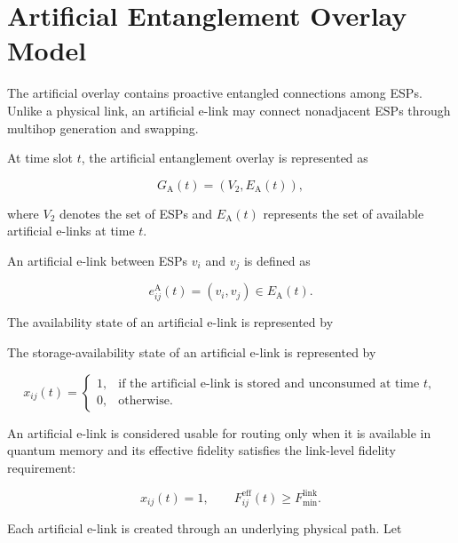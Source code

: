 \section{Artificial Entanglement Overlay Model}

The artificial overlay contains proactive entangled connections among ESPs.
Unlike a physical link, an artificial e-link may connect nonadjacent ESPs
through multihop generation and swapping.

At time slot $t$, the artificial entanglement overlay is represented as

\begin{equation}
    G_{\mathrm{A}}(t)
    =
    \left(
    V_{2},
    E_{\mathrm{A}}(t)
    \right),
\end{equation}

where $V_{2}$ denotes the set of ESPs and $E_{\mathrm{A}}(t)$ represents the set of available artificial e-links at time $t$.

An artificial e-link between ESPs $v_i$ and $v_j$ is defined as

\begin{equation}
    e_{ij}^{\mathrm{A}}(t)
    =
    \left(
    v_i,
    v_j
    \right)
    \in
    E_{\mathrm{A}}(t).
\end{equation}

The availability state of an artificial e-link is represented by

The storage-availability state of an artificial e-link is represented by

\begin{equation}
    x_{ij}(t)
    =
    \begin{cases}
        1, & \text{if the artificial e-link is stored and unconsumed at time } t,\\
        0, & \text{otherwise}.
    \end{cases}
\end{equation}

An artificial e-link is considered usable for routing only when it is
available in quantum memory and its effective fidelity satisfies the
link-level fidelity requirement:

\begin{equation}
    x_{ij}(t)=1,
    \qquad
    F_{ij}^{\mathrm{eff}}(t)
    \geq
    F_{\min}^{\mathrm{link}}.
\end{equation}

Each artificial e-link is created through an underlying physical path. Let

